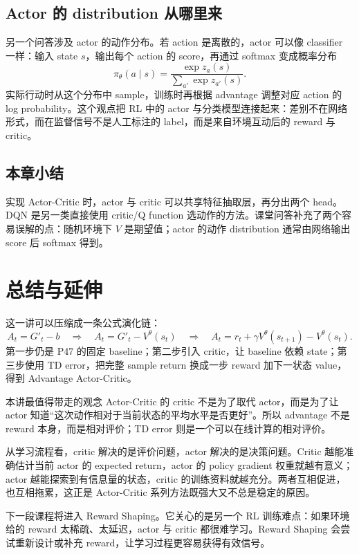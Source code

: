 \documentclass[a4paper]{article}
\newcommand{\policy}{\pi_\theta}
\newcommand{\val}{V^\theta}
\begin{document}
\subsection{Actor 的 distribution 从哪里来}

另一个问答涉及 actor 的动作分布。若 action 是离散的，actor 可以像 classifier 一样：输入 state $s$，输出每个 action 的 score，再通过 softmax 变成概率分布
\[
    \policy(a\mid s)
    =
    \frac{\exp z_a(s)}
    {\sum_{a'}\exp z_{a'}(s)}.
\]
实际行动时从这个分布中 sample，训练时再根据 advantage 调整对应 action 的 log probability。这个观点把 RL 中的 actor 与分类模型连接起来：差别不在网络形式，而在监督信号不是人工标注的 label，而是来自环境互动后的 reward 与 critic。

\subsection{本章小结}

实现 Actor-Critic 时，actor 与 critic 可以共享特征抽取层，再分出两个 head。DQN 是另一类直接使用 critic/Q function 选动作的方法。课堂问答补充了两个容易误解的点：随机环境下 $V$ 是期望值；actor 的动作 distribution 通常由网络输出 score 后 softmax 得到。

\section{总结与延伸}

这一讲可以压缩成一条公式演化链：
\[
    A_t=G'_t-b
    \quad\Longrightarrow\quad
    A_t=G'_t-\val(s_t)
    \quad\Longrightarrow\quad
    A_t=r_t+\gamma\val(s_{t+1})-\val(s_t).
\]
第一步仍是 P47 的固定 baseline；第二步引入 critic，让 baseline 依赖 state；第三步使用 TD error，把完整 sample return 换成一步 reward 加下一状态 value，得到 Advantage Actor-Critic。

\begin{importantbox}{本讲最值得带走的观念}
    Actor-Critic 的 critic 不是为了取代 actor，而是为了让 actor 知道``这次动作相对于当前状态的平均水平是否更好''。所以 advantage 不是 reward 本身，而是相对评价；TD error 则是一个可以在线计算的相对评价。
\end{importantbox}

从学习流程看，critic 解决的是评价问题，actor 解决的是决策问题。Critic 越能准确估计当前 actor 的 expected return，actor 的 policy gradient 权重就越有意义；actor 越能探索到有信息量的状态，critic 的训练资料就越充分。两者互相促进，也互相拖累，这正是 Actor-Critic 系列方法既强大又不总是稳定的原因。

下一段课程将进入 Reward Shaping。它关心的是另一个 RL 训练难点：如果环境给的 reward 太稀疏、太延迟，actor 与 critic 都很难学习。Reward Shaping 会尝试重新设计或补充 reward，让学习过程更容易获得有效信号。
\end{document}
